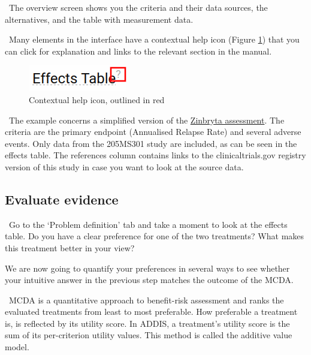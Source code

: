 \documentclass[00_mcda_tutorial.tex]{subfiles}
\begin{document}
\noindent \faGraduationCap \, The overview screen shows you the criteria and their data sources, the alternatives, and the table with measurement data.
\newline

\noindent \faLightbulbO \, Many elements in the interface have a contextual help icon (Figure \ref{fig:tooltip}) that you can click for explanation and links to the relevant section in the manual.
\newline

\begin{figure}[!h]
    \centering
	\includegraphics[width=.3\textwidth]{fig/contextHelp.png}
    \caption{Contextual help icon, outlined in red}
	\label{fig:tooltip}
\end{figure}

\noindent \faGraduationCap \, The example concerns a simplified version of the \href{https://www.ema.europa.eu/en/medicines/human/EPAR/zinbryta#authorisation-details-section}{Zinbryta assessment}. The criteria are the primary endpoint (Annualised Relapse Rate) and several adverse events. Only data from the 205MS301 study are included, as can be seen in the effects table. The references column contains links to the clinicaltrials.gov registry version of this study in case you want to look at the source data.

\subsection*{Evaluate evidence}
\leftpointright \, Go to the ‘Problem definition’ tab and take a moment to look at the effects table. Do you have a clear preference for one of the two treatments? What makes this treatment better in your view?
\newline

\noindent We are now going to quantify your preferences in several ways to see whether your intuitive answer in the previous step matches the outcome of the MCDA.
\newline

\noindent \faGraduationCap \, MCDA is a quantitative approach to benefit-risk assessment and ranks the evaluated treatments from least to most preferable. How preferable a treatment is, is reflected by its utility score. In ADDIS, a treatment’s utility score is the sum of its per-criterion utility values. This method is called the additive value model.
\newline
\end{document}
